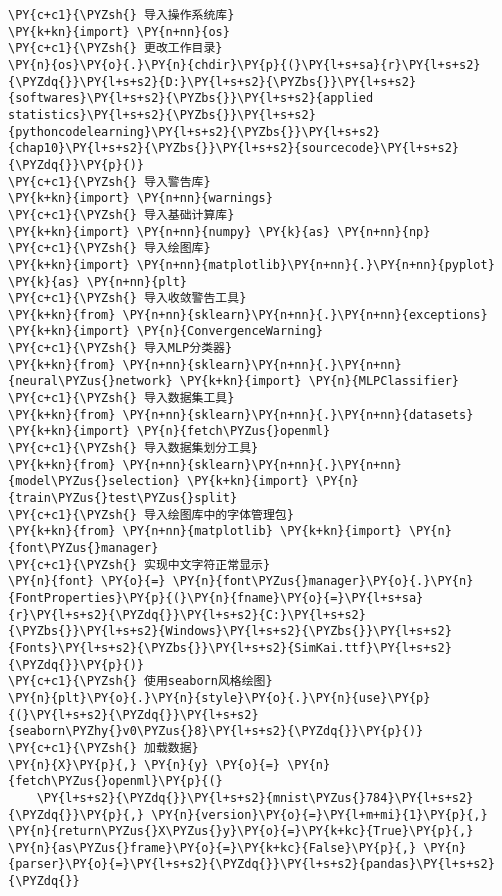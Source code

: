 \begin{Verbatim}[commandchars=\\\{\}]
\PY{c+c1}{\PYZsh{} 导入操作系统库}
\PY{k+kn}{import} \PY{n+nn}{os}
\PY{c+c1}{\PYZsh{} 更改工作目录}
\PY{n}{os}\PY{o}{.}\PY{n}{chdir}\PY{p}{(}\PY{l+s+sa}{r}\PY{l+s+s2}{\PYZdq{}}\PY{l+s+s2}{D:}\PY{l+s+s2}{\PYZbs{}}\PY{l+s+s2}{softwares}\PY{l+s+s2}{\PYZbs{}}\PY{l+s+s2}{applied statistics}\PY{l+s+s2}{\PYZbs{}}\PY{l+s+s2}{pythoncodelearning}\PY{l+s+s2}{\PYZbs{}}\PY{l+s+s2}{chap10}\PY{l+s+s2}{\PYZbs{}}\PY{l+s+s2}{sourcecode}\PY{l+s+s2}{\PYZdq{}}\PY{p}{)}
\PY{c+c1}{\PYZsh{} 导入警告库}
\PY{k+kn}{import} \PY{n+nn}{warnings}
\PY{c+c1}{\PYZsh{} 导入基础计算库}
\PY{k+kn}{import} \PY{n+nn}{numpy} \PY{k}{as} \PY{n+nn}{np}
\PY{c+c1}{\PYZsh{} 导入绘图库}
\PY{k+kn}{import} \PY{n+nn}{matplotlib}\PY{n+nn}{.}\PY{n+nn}{pyplot} \PY{k}{as} \PY{n+nn}{plt}
\PY{c+c1}{\PYZsh{} 导入收敛警告工具}
\PY{k+kn}{from} \PY{n+nn}{sklearn}\PY{n+nn}{.}\PY{n+nn}{exceptions} \PY{k+kn}{import} \PY{n}{ConvergenceWarning}
\PY{c+c1}{\PYZsh{} 导入MLP分类器}
\PY{k+kn}{from} \PY{n+nn}{sklearn}\PY{n+nn}{.}\PY{n+nn}{neural\PYZus{}network} \PY{k+kn}{import} \PY{n}{MLPClassifier}
\PY{c+c1}{\PYZsh{} 导入数据集工具}
\PY{k+kn}{from} \PY{n+nn}{sklearn}\PY{n+nn}{.}\PY{n+nn}{datasets} \PY{k+kn}{import} \PY{n}{fetch\PYZus{}openml}
\PY{c+c1}{\PYZsh{} 导入数据集划分工具}
\PY{k+kn}{from} \PY{n+nn}{sklearn}\PY{n+nn}{.}\PY{n+nn}{model\PYZus{}selection} \PY{k+kn}{import} \PY{n}{train\PYZus{}test\PYZus{}split}
\PY{c+c1}{\PYZsh{} 导入绘图库中的字体管理包}
\PY{k+kn}{from} \PY{n+nn}{matplotlib} \PY{k+kn}{import} \PY{n}{font\PYZus{}manager}
\PY{c+c1}{\PYZsh{} 实现中文字符正常显示}
\PY{n}{font} \PY{o}{=} \PY{n}{font\PYZus{}manager}\PY{o}{.}\PY{n}{FontProperties}\PY{p}{(}\PY{n}{fname}\PY{o}{=}\PY{l+s+sa}{r}\PY{l+s+s2}{\PYZdq{}}\PY{l+s+s2}{C:}\PY{l+s+s2}{\PYZbs{}}\PY{l+s+s2}{Windows}\PY{l+s+s2}{\PYZbs{}}\PY{l+s+s2}{Fonts}\PY{l+s+s2}{\PYZbs{}}\PY{l+s+s2}{SimKai.ttf}\PY{l+s+s2}{\PYZdq{}}\PY{p}{)}
\PY{c+c1}{\PYZsh{} 使用seaborn风格绘图}
\PY{n}{plt}\PY{o}{.}\PY{n}{style}\PY{o}{.}\PY{n}{use}\PY{p}{(}\PY{l+s+s2}{\PYZdq{}}\PY{l+s+s2}{seaborn\PYZhy{}v0\PYZus{}8}\PY{l+s+s2}{\PYZdq{}}\PY{p}{)}
\PY{c+c1}{\PYZsh{} 加载数据}
\PY{n}{X}\PY{p}{,} \PY{n}{y} \PY{o}{=} \PY{n}{fetch\PYZus{}openml}\PY{p}{(}
    \PY{l+s+s2}{\PYZdq{}}\PY{l+s+s2}{mnist\PYZus{}784}\PY{l+s+s2}{\PYZdq{}}\PY{p}{,} \PY{n}{version}\PY{o}{=}\PY{l+m+mi}{1}\PY{p}{,} \PY{n}{return\PYZus{}X\PYZus{}y}\PY{o}{=}\PY{k+kc}{True}\PY{p}{,} \PY{n}{as\PYZus{}frame}\PY{o}{=}\PY{k+kc}{False}\PY{p}{,} \PY{n}{parser}\PY{o}{=}\PY{l+s+s2}{\PYZdq{}}\PY{l+s+s2}{pandas}\PY{l+s+s2}{\PYZdq{}}

\end{Verbatim}
